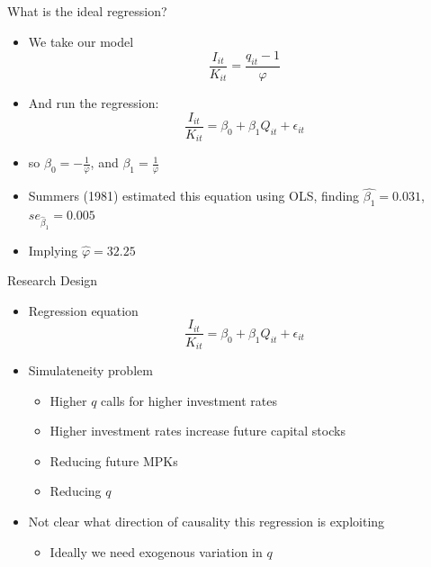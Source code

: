 \documentclass[11pt,aspectratio=169,xcolor={dvipsnames},hyperref={pdftex,pdfpagemode=UseNone,hidelinks,pdfdisplaydoctitle=true},usepdftitle=false]{beamer}
\begin{document}
\begin{frame}{What is the ideal regression?}
\begin{itemize}
\item We take our model
$$\frac{I_{it}}{K_{it}} =  \frac{q_{it} - 1}{\varphi}$$
\pause
\vspace{-0.5cm}
\item And run the regression:
$$\frac{I_{it}}{K_{it}} = \beta_0 + \beta_1 Q_{it}  + \epsilon_{it}$$
\vspace{-0.5cm}
\pause
\item so $\beta_0 =  - \frac{1}{\varphi}$, and $\beta_1 = \frac{1}{\varphi}$
\item Summers (1981) estimated this equation using OLS, finding $\hat{\beta_1} = 0.031$, $se_{\hat{\beta}_1} = 0.005$
\pause
\item Implying $\hat{\varphi} = 32.25$
\end{itemize}
\end{frame}


\begin{frame}{Research Design}
\begin{itemize}
\item Regression equation
$$\frac{I_{it}}{K_{it}} = \beta_0 + \beta_1 Q_{it}  + \epsilon_{it}$$
\item Simulateneity problem
\begin{itemize}
\item Higher $q$ calls for higher investment rates
\item Higher investment rates increase future capital stocks
\item Reducing future MPKs
\item Reducing $q$
\end{itemize}
\item Not clear what direction of causality this regression is exploiting
\begin{itemize}
\item Ideally we need exogenous variation in $q$
\end{itemize}
\end{itemize}	
\end{frame}
\end{document}
